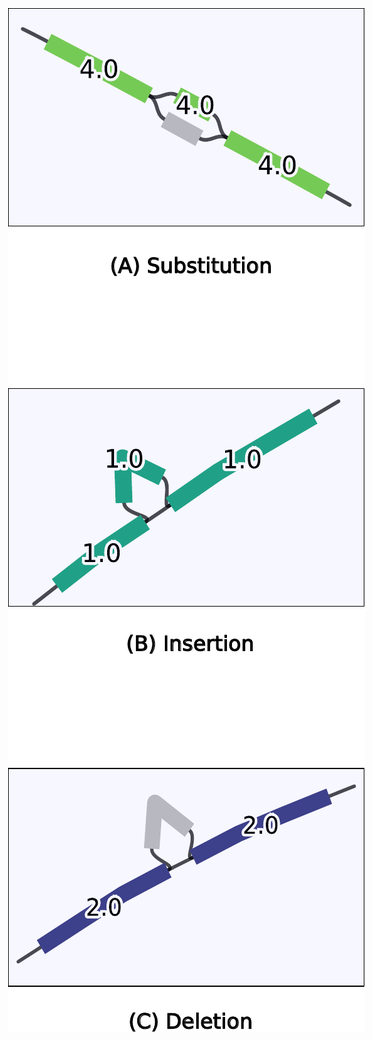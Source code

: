 \documentclass{bioinfo}
\theoremstyle{definition}
\begin{document}
\begin{figure}[htbp]
	\centering
	\begin{minipage}[b]{0.35\columnwidth}
		\includegraphics[width=\textwidth]{panels.pdf}

\end{minipage}
\end{figure}
\end{document}
